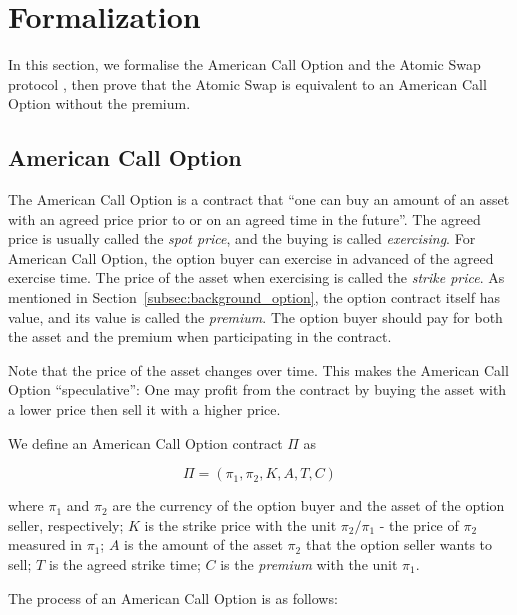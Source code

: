 \section{Formalization}
\label{sec:formalization}

In this section, we formalise the American Call Option and the Atomic Swap protocol ,
then prove that the Atomic Swap is equivalent to an American Call Option without the premium.

\subsection{American Call Option}

The American Call Option is a contract that ``one can buy an amount of an asset with an agreed price prior to or on an agreed time in the future''. 
The agreed price is usually called the \textit{spot price}, and the buying is called \textit{exercising}.
For American Call Option, the option buyer can exercise in advanced of the agreed exercise time.
The price of the asset when exercising is called the \textit{strike price}.
As mentioned in Section~\ref{subsec:background_option}, the option contract itself has value, and its value is called the \textit{premium}.
The option buyer should pay for both the asset and the premium when participating in the contract.

Note that the price of the asset changes over time. This makes the American Call Option ``speculative'': One may profit from the contract by buying the asset with a lower price then sell it with a higher price.

\begin{definition}
We define an American Call Option contract $\Pi$ as

$$\Pi = (\pi_1, \pi_2, K, A, T, C)$$

where
$\pi_1$ and $\pi_2$ are the currency of the option buyer and the asset of the option seller, respectively; 
$K$ is the strike price with the unit $\pi_2 / \pi_1$ - the price of $\pi_2$ measured in $\pi_1$;
$A$ is the amount of the asset $\pi_2$ that the option seller wants to sell;
$T$ is the agreed strike time;
$C$ is the \textit{premium} with the unit $\pi_1$.
\end{definition}

The process of an American Call Option is as follows:

